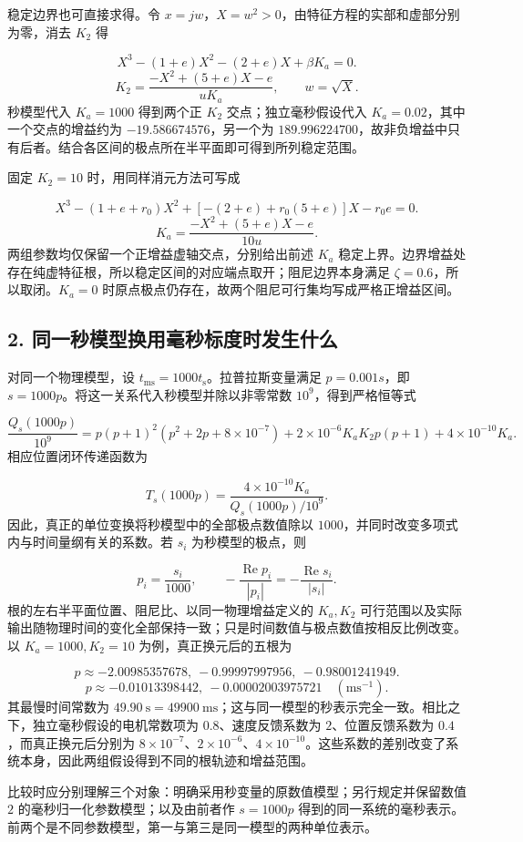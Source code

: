 \documentclass[UTF8,a4paper,11pt]{ctexart}
\begin{document}
稳定边界也可直接求得。令 $x=jw$，$X=w^2>0$，由特征方程的实部和虚部分别为零，消去 $K_2$ 得

\[X^3-(1+e)X^2-(2+e)X+\beta K_a=0.\]
\[K_2=\frac{-X^2+(5+e)X-e}{uK_a},\qquad w=\sqrt X.\]
秒模型代入 $K_a=1000$ 得到两个正 $K_2$ 交点；独立毫秒假设代入 $K_a=0.02$，其中一个交点的增益约为 $-19.586674576$，另一个为 $189.996224700$，故非负增益中只有后者。结合各区间的极点所在半平面即可得到所列稳定范围。

固定 $K_2=10$ 时，用同样消元方法可写成

\[X^3-(1+e+r_0)X^2+[-(2+e)+r_0(5+e)]X-r_0e=0.\]
\[K_a=\frac{-X^2+(5+e)X-e}{10u}.\]
两组参数均仅保留一个正增益虚轴交点，分别给出前述 $K_a$ 稳定上界。边界增益处存在纯虚特征根，所以稳定区间的对应端点取开；阻尼边界本身满足 $\zeta=0.6$，所以取闭。$K_a=0$ 时原点极点仍存在，故两个阻尼可行集均写成严格正增益区间。

\subsection*{2. 同一秒模型换用毫秒标度时发生什么}
对同一个物理模型，设 $t_{\mathrm{ms}}=1000t_{\mathrm{s}}$。拉普拉斯变量满足 $p=0.001s$，即 $s=1000p$。将这一关系代入秒模型并除以非零常数 $10^9$，得到严格恒等式

\[\frac{Q_s(1000p)}{10^9}=p(p+1)^2(p^2+2p+8\times10^{-7})+2\times10^{-6}K_aK_2p(p+1)+4\times10^{-10}K_a.\]
相应位置闭环传递函数为

\[T_s(1000p)=\frac{4\times10^{-10}K_a}{Q_s(1000p)/10^9}.\]
因此，真正的单位变换将秒模型中的全部极点数值除以 $1000$，并同时改变多项式内与时间量纲有关的系数。若 $s_i$ 为秒模型的极点，则

\[p_i=\frac{s_i}{1000},\qquad -\frac{\operatorname{Re}p_i}{|p_i|}=-\frac{\operatorname{Re}s_i}{|s_i|}.\]
根的左右半平面位置、阻尼比、以同一物理增益定义的 $K_a,K_2$ 可行范围以及实际输出随物理时间的变化全部保持一致；只是时间数值与极点数值按相反比例改变。以 $K_a=1000,K_2=10$ 为例，真正换元后的五根为

\[p\approx-2.00985357678,\ -0.99997997956,\ -0.98001241949.\]
\[p\approx-0.01013398442,\ -0.00002003975721\quad(\mathrm{ms}^{-1}).\]
其最慢时间常数为 $49.90\ \mathrm{s}=49900\ \mathrm{ms}$；这与同一模型的秒表示完全一致。相比之下，独立毫秒假设的电机常数项为 $0.8$、速度反馈系数为 $2$、位置反馈系数为 $0.4$，而真正换元后分别为 $8\times10^{-7}$、$2\times10^{-6}$、$4\times10^{-10}$。这些系数的差别改变了系统本身，因此两组假设得到不同的根轨迹和增益范围。

比较时应分别理解三个对象：明确采用秒变量的原数值模型；另行规定并保留数值 $2$ 的毫秒归一化参数模型；以及由前者作 $s=1000p$ 得到的同一系统的毫秒表示。前两个是不同参数模型，第一与第三是同一模型的两种单位表示。
\end{document}

